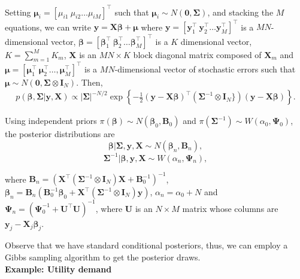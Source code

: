 Setting $\bm{\mu}_i=\left[\mu_{i1} \ \mu_{i2} \dots \mu_{iM}\right]^{\top}$ such that $\bm{\mu}_i\sim{N}(\bm{0},\bm{\Sigma})$, and stacking the $M$ equations, we can write $\bm{y}=\bm{X}\bm{\beta}+\bm{\mu}$ where $\bm{y}=\left[\bm{y}_{1}^{\top} \ \bm{y}_{2}^{\top} \dots \bm{y}_{M}^{\top}\right]^{\top}$ is a $MN$-dimensional vector,  $\bm{\beta}=\left[\bm{\beta}_{1}^{\top} \ \bm{\beta}_{2}^{\top} \ldots \bm{\beta}_{M}^{\top}\right]^{\top}$ is a $ K$ dimensional vector, $K=\sum_{m=1}^{M} K_m$, $\bm{X}$ is an $MN\times K$ block diagonal matrix composed of $\bm{X}_{m}$ and $\bm{\mu}=\left[\bm{\mu}_{1}^{\top} \ \bm{\mu}_{2}^{\top} \dots ,\bm{\mu}_{M}^{\top}\right]^{\top}$ is a $MN$-dimensional vector of stochastic errors such that $\bm{\mu}\sim{N}(\bm{0},\bm{\Sigma}\otimes \bm{I}_N)$.
Then, 
\begin{align*}
	p(\bm{\beta},\bm{\Sigma}|\bm{y},\bm{X})\propto \left|\bm{\Sigma} \right|^{-N/2}\exp\left\{ -\frac{1}{2}(\bm{y}-\bm{X\beta})^{\top}(\bm{\Sigma}^{-1}\otimes \bm{I}_N\})(\bm{y}-\bm{X\beta})\right\}.
\end{align*}

Using independent priors $\pi(\bm{\beta})\sim{N}(\bm{\beta}_0,\bm{B}_0)$ and $\pi(\bm{\Sigma}^{-1})\sim{W}(\alpha_0,\bm{\Psi}_0)$, the posterior distributions are
\begin{equation*}
	\bm{\beta}|\bm{\Sigma}, \bm{y}, \bm{X} \sim {N}(\bm{\beta}_n, \bm{B}_n), 
\end{equation*}
\begin{equation*}
	\bm{\Sigma}^{-1}|\bm{\beta}, \bm{y}, \bm{X} \sim {W}(\alpha_n, \bm{\Psi}_n),
\end{equation*}

where $\bm{B}_n=(\bm{X}^{\top}(\bm{\Sigma}^{-1}\otimes \bm{I}_N )\bm{X}+\bm{B}_0^{-1})^{-1}$, $\bm{\beta}_n=\bm{B}_n(\bm{B}_0^{-1}\bm{\beta}_0 + \bm{X}^{\top}(\bm{\Sigma}^{-1}\otimes \bm{I}_N)\bm{y})$, $\alpha_n = \alpha_0 + N$ and $\bm{\Psi}_n = (\bm{\Psi}_0^{-1} + \bm{U}^{\top}\bm{U})^{-1}$, where $\bm{U}$ is an $N\times M$ matrix whose columns are $\bm{y}_j-\bm{X}_j\bm{\beta}_j$.

Observe that we have standard conditional posteriors, thus, we can employ a Gibbs sampling algorithm to get the posterior draws.\\

\textbf{Example: Utility demand}

